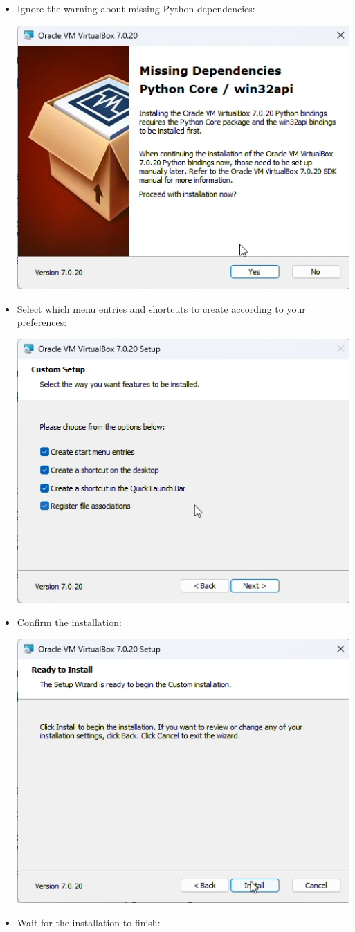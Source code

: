 \begin{enumerate}
\begin{itemize}
\begin{center}
      \end{center}
   \item Ignore the warning about missing Python dependencies:
      \begin{center}
      \includegraphics[width=.5\textwidth]{screen7.png}
      \end{center}
   \item Select which menu entries and shortcuts to create according to your preferences:
      \begin{center}
      \includegraphics[width=.5\textwidth]{screen8.png}
      \end{center}
   \item Confirm the installation:
      \begin{center}
      \includegraphics[width=.5\textwidth]{screen9.png}
      \end{center}
   \item Wait for the installation to finish:
      \begin{center}

\end{center}
\end{itemize}
\end{enumerate}
